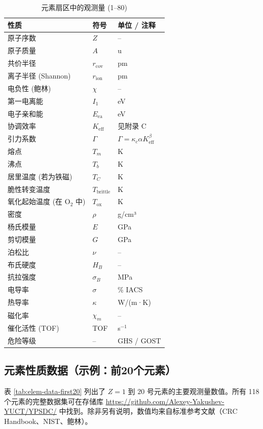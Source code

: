 \documentclass[12pt,a4paper]{article}
\newcommand{\Keff}{K_{\mathrm{eff}}}
\newcommand{\Gcoeff}{\Gamma}
\begin{document}
	\begin{longtable}{p{4cm} p{3cm} p{8cm}}
		\caption{元素扇区中的观测量 (1–80)} \\
		\toprule
		\textbf{性质} & \textbf{符号} & \textbf{单位 / 注释} \\
		\midrule
		原子序数 & \(Z\) & – \\
		原子质量 & \(A\) & u \\
		共价半径 & \(r_{\text{cov}}\) & pm \\
		离子半径 (Shannon) & \(r_{\text{ion}}\) & pm \\
		电负性 (鲍林) & \(\chi\) & – \\
		第一电离能 & \(I_1\) & eV \\
		电子亲和能 & \(E_{\text{ea}}\) & eV \\
		协调效率 & \(\Keff\) & 见附录 C \\
		引力系数 & \(\Gcoeff\) & \(\Gcoeff = \kappa_c \alpha \Keff^{\beta}\) \\
		熔点 & \(T_m\) & K \\
		沸点 & \(T_b\) & K \\
		居里温度 (若为铁磁) & \(T_C\) & K \\
		脆性转变温度 & \(T_{\text{brittle}}\) & K \\
		氧化起始温度 (在 O\(_{2}\) 中) & \(T_{\text{ox}}\) & K \\
		密度 & \(\rho\) & g/cm³ \\
		杨氏模量 & \(E\) & GPa \\
		剪切模量 & \(G\) & GPa \\
		泊松比 & \(\nu\) & – \\
		布氏硬度 & \(H_B\) & – \\
		抗拉强度 & \(\sigma_B\) & MPa \\
		电导率 & \(\sigma\) & \% IACS \\
		热导率 & \(\kappa\) & W/(m·K) \\
		磁化率 & \(\chi_m\) & – \\
		催化活性 (TOF) & TOF & s\(^{-1}\) \\
		危险等级 & – & GHS / GOST \\
		\bottomrule
	\end{longtable}
	
	
	\subsection{元素性质数据（示例：前20个元素）}
	
	表 \ref{tab:elem-data-first20} 列出了 \(Z=1\) 到 \(20\) 号元素的主要观测量数值。所有 118 个元素的完整数据集可在存储库 \url{https://github.com/Alexey-Yakushev-YUCT/YPSDC/} 中找到。除非另有说明，数值均来自标准参考文献（CRC Handbook、NIST、鲍林）。
	
\end{document}
